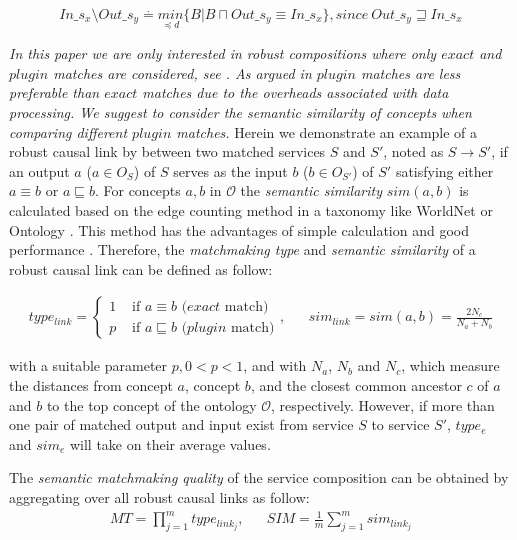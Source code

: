\begin{equation}
In\_s_x \setminus Out\_s_y \stackrel{.}{=} \underset {\preceq d}{min} \{ B|B\sqcap  Out\_s_y \equiv In\_s_x  \} , since \  Out\_s_y \sqsupseteq In\_s_x
 \label{equation2}
\end{equation}



\emph{In this paper we are only interested in robust compositions where only $exact$ and $plugin$ matches are considered, see \cite{lecue2009optimizing}. As argued in \cite{lecue2009optimizing} $plugin$ matches are less preferable than $exact$ matches due to the overheads associated with data processing. We suggest to consider the semantic similarity of concepts when comparing different $plugin$ matches.} Herein we demonstrate an example of a robust causal link by between two matched services $S$ and $S'$, noted as $S \rightarrow S'$, if an output $a$ ($a \in {O_S}$) of $S$ serves as the input $b$ ($b \in {O_{S'}}$) of $S'$ satisfying either $a \equiv b$ or $a \sqsubseteq b$.  For concepts $a, b$ in $\mathcal{O}$ the \emph{semantic similarity} $sim(a, b)$ is calculated based on the edge counting method in a taxonomy like WorldNet or Ontology \cite{shet2012new}. This method has the advantages of simple calculation and good performance \cite{shet2012new}. Therefore, the \emph{matchmaking type} and \emph{semantic similarity} of a robust causal link can be defined as follow:

\begin{align}
\label{eq_link}
type_{link} = 
\begin{cases}
	1 & \text{ if $a\equiv b$ ($exact$ match)}\\
	p & \text{ if $a \sqsubseteq b$ ($plugin$ match)}
\end{cases}
,&&
sim_{link} = sim(a,b) = \frac{2N_c}{N_{a}+N_{b}}
\end{align}

\noindent with a suitable parameter $p, 0<p< 1$, and with $N_a$, $N_b$ and $N_c$, which measure the distances from concept $a$, concept $b$, and the closest common ancestor $c$ of $a$ and $b$ to the top concept of the ontology $\mathcal{O}$, respectively. However, if more than one pair of matched output and input exist from service $S$ to service $S'$, $type_e$ and $sim_e$ will take on their average values.

The \emph{semantic matchmaking quality} of the service composition can be obtained by aggregating over all robust causal links as follow:
\begin{align}
MT {=} \prod_{j=1}^{m} type_ {link_{j}}
,&&
SIM {=} \frac{1}{m}\sum_{j=1}^m sim_ {link_{j}}  
\end{align}


